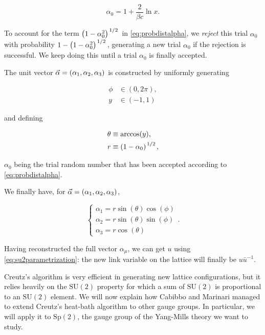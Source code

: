 \documentclass[reqno,12pt]{article}
\numberwithin{equation}{section}
\newcommand{\SU}{\mathrm{SU}}
\newcommand{\Sp}{\mathrm{Sp}}
\begin{document}
\begin{equation}
	\alpha_0 = 1 + \frac{2}{\beta c}\ln{x}.
\end{equation}

To account for the term $\qty(1 - \alpha_0^2)^{\flatfrac{1}{2}}$ in \eqref{eq:probdistalpha}, we \textit{reject} this trial
$\alpha_0$ with probability $1 - \qty(1 - \alpha_0^2)^{\flatfrac{1}{2}}$, generating a new trial $\alpha_0$ if 
the rejection is successful. We keep doing this until a trial $\alpha_0$ is finally accepted. 

The unit vector $\va{\alpha} = (\alpha_1, \alpha_2, \alpha_3)$ is constructed by uniformly generating 

\begin{equation}
	\begin{aligned}
		\phi &\in (0, 2\pi), \\
		y &\in (-1, 1)
	\end{aligned}
\end{equation}

and defining 

\begin{equation}
	\begin{aligned}
		\theta &\equiv \arccos(y), \\
		r &\equiv \qty(1 - \alpha_0)^{\flatfrac{1}{2}},
	\end{aligned}
\end{equation}

$\alpha_0$ being the trial random number that has been accepted according to \eqref{eq:probdistalpha}. 

We finally have, for $\va{\alpha} = (\alpha_1, \alpha_2, \alpha_3)$,

\begin{equation}
	\begin{cases}
		\alpha_1 = r \sin(\theta) \cos(\phi) \\
		\alpha_2 = r \sin(\theta) \sin(\phi) \\
		\alpha_3 = r \cos(\theta)
	\end{cases}.
\end{equation}

Having reconstructed the full vector $\alpha_\mu$, we can get $u$ using \eqref{eq:su2parametrization}: the new link
variable on the lattice will finally be $u \bar{u}^{-1}$.

Creutz's algorithm is very efficient in generating new lattice configurations, but it relies heavily on the $\SU(2)$
property for which a sum of $\SU(2)$ is proportional to an $\SU(2)$ element. We will now explain how Cabibbo and Marinari
managed to extend Creutz's heat-bath algorithm to other gauge groups. In particular, we will apply it to $\Sp(2)$, the gauge
group of the Yang-Mills theory we want to study.
\end{document}
